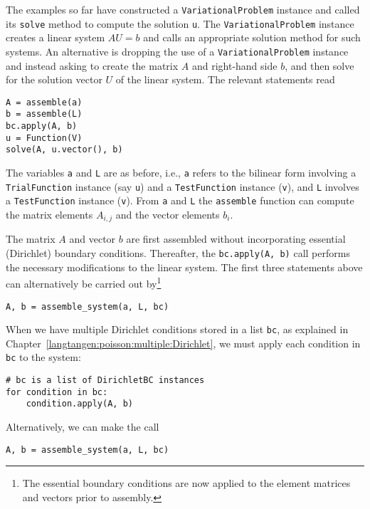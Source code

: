 The examples so far have constructed a {\fontsize{12pt}{12pt}\verb!VariationalProblem!} instance
and called its {\fontsize{12pt}{12pt}\verb!solve!} method to compute the solution 
{\fontsize{12pt}{12pt}\verb!u!}. 
The {\fontsize{12pt}{12pt}\texttt{VariationalProblem}} instance creates a linear system
$AU=b$ and calls an appropriate solution method for such systems.
An alternative is dropping the use of a {\fontsize{12pt}{12pt}\texttt{VariationalProblem}}
instance and instead asking
\fenics{} to create the matrix $A$
and right-hand side $b$, and then solve for the
solution vector $U$ of the linear system.
The relevant statements read
\begin{Verbatim}[fontsize=\fontsize{10pt}{10pt},tabsize=8,baselinestretch=1.05,
fontfamily=tt,xleftmargin=7mm]
A = assemble(a)
b = assemble(L)
bc.apply(A, b)
u = Function(V)
solve(A, u.vector(), b)
\end{Verbatim}
\noindent
The variables {\fontsize{12pt}{12pt}\texttt{a}} and {\fontsize{12pt}{12pt}\texttt{L}} are as before, i.e., {\fontsize{12pt}{12pt}\texttt{a}} refers to the
bilinear form involving a {\fontsize{12pt}{12pt}\texttt{TrialFunction}} instance (say {\fontsize{12pt}{12pt}\texttt{u}})
and a {\fontsize{12pt}{12pt}\texttt{TestFunction}} instance ({\fontsize{12pt}{12pt}\texttt{v}}), and {\fontsize{12pt}{12pt}\texttt{L}} involves a
{\fontsize{12pt}{12pt}\texttt{TestFunction}} instance ({\fontsize{12pt}{12pt}\texttt{v}}). From {\fontsize{12pt}{12pt}\texttt{a}} and {\fontsize{12pt}{12pt}\texttt{L}}
the {\fontsize{12pt}{12pt}\texttt{assemble}} function can
compute the matrix elements $A_{i,j}$ and the vector elements $b_i$.

The matrix $A$ and vector $b$ are first assembled without incorporating 
essential (Dirichlet) boundary conditions. Thereafter, the
{\fontsize{12pt}{12pt}\verb!bc.apply(A, b)!} call performs the necessary modifications to
the linear system. The first three statements above can alternatively
be carried out by\footnote{The essential boundary conditions are 
now applied to the element matrices and vectors prior to assembly.}
\begin{Verbatim}[fontsize=\fontsize{10pt}{10pt},tabsize=8,baselinestretch=1.05,
fontfamily=tt,xleftmargin=7mm]
A, b = assemble_system(a, L, bc)
\end{Verbatim}
\noindent

When we have multiple Dirichlet conditions stored in a list {\fontsize{12pt}{12pt}\texttt{bc}}, 
as explained in
Chapter~\ref{langtangen:poisson:multiple:Dirichlet}, we must apply
each condition in {\fontsize{12pt}{12pt}\texttt{bc}} to the system:
\begin{Verbatim}[fontsize=\fontsize{10pt}{10pt},tabsize=8,baselinestretch=1.05,
fontfamily=tt,xleftmargin=7mm]
# bc is a list of DirichletBC instances
for condition in bc:
    condition.apply(A, b)
\end{Verbatim}
\noindent
Alternatively, we can make the call
\begin{Verbatim}[fontsize=\fontsize{10pt}{10pt},tabsize=8,baselinestretch=1.05,
fontfamily=tt,xleftmargin=7mm]
A, b = assemble_system(a, L, bc)
\end{Verbatim}
\noindent

